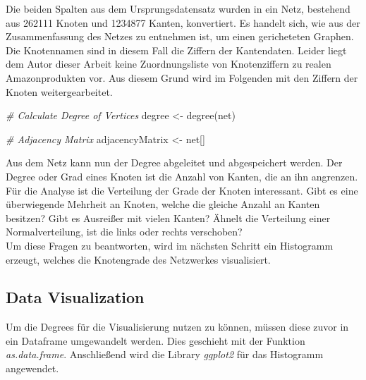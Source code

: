 \documentclass[
  12 pt,
]{article}
\newenvironment{Shaded}{\begin{snugshade}}{\end{snugshade}}
\newcommand{\CommentTok}[1]{\textcolor[rgb]{0.56,0.35,0.01}{\textit{#1}}}
\newcommand{\FunctionTok}[1]{\textcolor[rgb]{0.00,0.00,0.00}{#1}}
\newcommand{\NormalTok}[1]{#1}
\newcommand{\OtherTok}[1]{\textcolor[rgb]{0.56,0.35,0.01}{#1}}
\begin{document}
Die beiden Spalten aus dem Ursprungsdatensatz wurden in ein Netz,
bestehend aus 262111 Knoten und 1234877 Kanten, konvertiert. Es handelt
sich, wie aus der Zusammenfassung des Netzes zu entnehmen ist, um einen
gericheteten Graphen. Die Knotennamen sind in diesem Fall die Ziffern
der Kantendaten. Leider liegt dem Autor dieser Arbeit keine
Zuordnungsliste von Knotenziffern zu realen Amazonprodukten vor. Aus
diesem Grund wird im Folgenden mit den Ziffern der Knoten
weitergearbeitet.\\

\begin{Shaded}
\begin{Highlighting}[]
\CommentTok{\# Calculate Degree of Vertices}
\NormalTok{degree }\OtherTok{\textless{}{-}} \FunctionTok{degree}\NormalTok{(net)}

\CommentTok{\# Adjacency Matrix}
\NormalTok{adjacencyMatrix }\OtherTok{\textless{}{-}}\NormalTok{ net[]}
\end{Highlighting}
\end{Shaded}

Aus dem Netz kann nun der Degree abgeleitet und abgespeichert werden.
Der Degree oder Grad eines Knoten ist die Anzahl von Kanten, die an ihn
angrenzen. Für die Analyse ist die Verteilung der Grade der Knoten
interessant. Gibt es eine überwiegende Mehrheit an Knoten, welche die
gleiche Anzahl an Kanten besitzen? Gibt es Ausreißer mit vielen Kanten?
Ähnelt die Verteilung einer Normalverteilung, ist die links oder rechts
verschoben?\\
Um diese Fragen zu beantworten, wird im nächsten Schritt ein Histogramm
erzeugt, welches die Knotengrade des Netzwerkes visualisiert.\\

\hypertarget{data-visualization}{%
\subsection{Data Visualization}\label{data-visualization}}

Um die Degrees für die Visualisierung nutzen zu können, müssen diese
zuvor in ein Dataframe umgewandelt werden. Dies geschieht mit der
Funktion \textit{as.data.frame}. Anschließend wird die Library
\textit{ggplot2} für das Histogramm angewendet.
\end{document}
